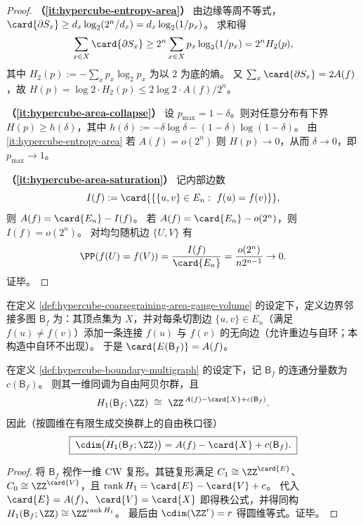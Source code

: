 \begin{proof}
\textbf{（\ref{it:hypercube-entropy-area}）}
由边缘等周不等式，\(\card{\partial S_x}\ge d_x\log_2(2^n/d_x)=d_x\log_2(1/p_x)\)。
求和得
\[
\sum_{x\in X}\card{\partial S_x}
\ge
2^n\sum_{x\in X}p_x\log_2(1/p_x)
=
2^n H_2(p),
\]
其中 \(H_2(p):=-\sum_x p_x\log_2 p_x\) 为以 \(2\) 为底的熵。
又 \(\sum_x\card{\partial S_x}=2A(f)\)，故 \(H(p)=\log 2\cdot H_2(p)\le 2\log 2\cdot A(f)/2^n\)。

\textbf{（\ref{it:hypercube-area-collapse}）}
设 \(p_{\max}=1-\delta\)。则对任意分布有下界 \(H(p)\ge h(\delta)\)，其中
\(
h(\delta):=-\delta\log\delta-(1-\delta)\log(1-\delta)
\)。
由 \ref{it:hypercube-entropy-area} 若 \(A(f)=o(2^n)\) 则 \(H(p)\to 0\)，从而 \(\delta\to 0\)，即 \(p_{\max}\to 1\)。

\textbf{（\ref{it:hypercube-area-saturation}）}
记内部边数
\[
I(f):=\card{\{\{u,v\}\in E_n:\ f(u)=f(v)\}},
\]
则 \(A(f)=\card{E_n}-I(f)\)。
若 \(A(f)=\card{E_n}-o(2^n)\)，则 \(I(f)=o(2^n)\)。
对均匀随机边 \(\{U,V\}\) 有
\[
\PP(f(U)=f(V))=\frac{I(f)}{\card{E_n}}=\frac{o(2^n)}{n2^{n-1}}\to 0.
\]
证毕。
\end{proof}

\begin{definition}[边界邻接多图]\label{def:hypercube-boundary-multigraph}
在定义 \ref{def:hypercube-coarsegraining-area-gauge-volume} 的设定下，定义边界邻接多图 \(\mathsf B_f\) 为：其顶点集为 \(X\)，并对每条切割边 \(\{u,v\}\in E_n\)（满足 \(f(u)\neq f(v)\)）添加一条连接 \(f(u)\) 与 \(f(v)\) 的无向边（允许重边与自环；本构造中自环不出现）。
于是 \(\card{E(\mathsf B_f)}=A(f)\)。
\end{definition}

\begin{proposition}[回路圆维的欧拉恒等式]\label{prop:hypercube-boundary-multigraph-h1-cdim}
在定义 \ref{def:hypercube-boundary-multigraph} 的设定下，记 \(\mathsf B_f\) 的连通分量数为 \(c(\mathsf B_f)\)。
则其一维同调为自由阿贝尔群，且
\[
H_1(\mathsf B_f;\ZZ)\ \cong\ \ZZ^{\,A(f)-\card{X}+c(\mathsf B_f)}.
\]
因此（按圆维在有限生成交换群上的自由秩口径）
\[
\boxed{\;
\cdim\bigl(H_1(\mathsf B_f;\ZZ)\bigr)=A(f)-\card{X}+c(\mathsf B_f).
\;}
\]
\end{proposition}

\begin{proof}
将 \(\mathsf B_f\) 视作一维 CW 复形。其链复形满足 \(C_1\cong \ZZ^{\card{E}}\)、\(C_0\cong \ZZ^{\card{V}}\)，且
\(
\operatorname{rank}H_1=\card{E}-\card{V}+c
\)。
代入 \(\card{E}=A(f)\)、\(\card{V}=\card{X}\) 即得秩公式，并得同构 \(H_1(\mathsf B_f;\ZZ)\cong \ZZ^{\operatorname{rank}H_1}\)。
最后由 \(\cdim(\ZZ^r)=r\) 得圆维等式。证毕。
\end{proof}

